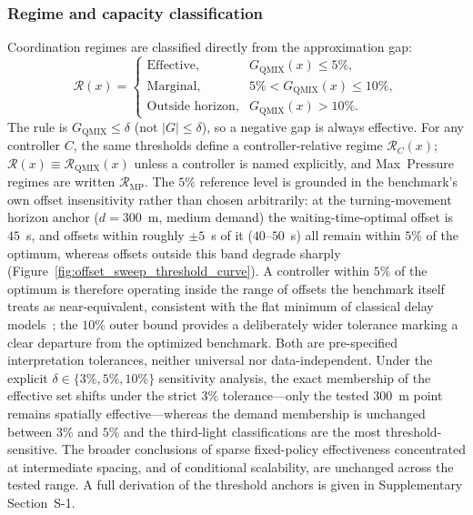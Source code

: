 \documentclass[review,12pt]{elsarticle}
\begin{document}
\subsubsection{Regime and capacity classification}
\label{subsubsec:coordination_regime}

Coordination regimes are classified directly from the approximation gap:
\begin{equation}
\mathcal{R}(x)=
\begin{cases}
\text{Effective},  & G_{\mathrm{QMIX}}(x)\leq 5\%,\\
\text{Marginal},   & 5\% < G_{\mathrm{QMIX}}(x)\leq 10\%,\\
\text{Outside horizon}, & G_{\mathrm{QMIX}}(x)>10\% .
\end{cases}
\label{eq:coordination_regime}
\end{equation}
The rule is $G_{\mathrm{QMIX}}\leq\delta$ (not $|G|\leq\delta$), so a negative gap is always effective. For any controller $C$, the same thresholds define a controller-relative regime $\mathcal{R}_C(x)$; $\mathcal{R}(x)\equiv\mathcal{R}_{\mathrm{QMIX}}(x)$ unless a controller is named explicitly, and Max~Pressure regimes are written $\mathcal{R}_{\mathrm{MP}}$. The $5\%$ reference level is grounded in the benchmark's own offset insensitivity rather than chosen arbitrarily: at the turning-movement horizon anchor
($d=300$~m, medium demand) the waiting-time-optimal offset is $45$~s, and offsets within roughly $\pm5$~s of it ($40$--$50$~s) all remain within $5\%$ of the optimum, whereas offsets outside this band degrade sharply (Figure~\ref{fig:offset_sweep_threshold_curve}). A controller within $5\%$ of the optimum is therefore operating inside the range of offsets the benchmark itself treats as near-equivalent, consistent with the flat minimum of classical delay models~\cite{webster1958,sadegh1988comparative}; the $10\%$ outer bound provides a deliberately wider tolerance marking a clear departure from the optimized benchmark. Both are pre-specified interpretation tolerances, neither universal nor data-independent. Under the explicit $\delta\in\{3\%,5\%,10\%\}$ sensitivity analysis, the exact membership of the effective set shifts under the strict $3\%$ tolerance---only the tested $300$~m point remains spatially effective---whereas the demand membership is unchanged between $3\%$ and $5\%$ and the third-light classifications are the most threshold-sensitive. The broader conclusions of sparse fixed-policy effectiveness concentrated at intermediate spacing, and of conditional scalability, are unchanged across the tested range. A full derivation of the threshold anchors is given in Supplementary Section~S-1.
\end{document}
